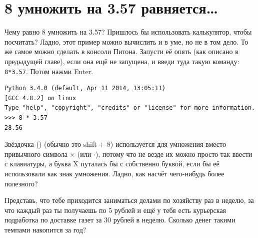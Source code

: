 

\chapter{8 умножить на 3.57 равняется…}\label{ch:8multipliedby3.57}

Чему равно 8 умножить на 3.57? Пришлось бы использовать калькулятор, чтобы посчитать? Ладно, этот пример можно вычислить и в уме, но не в том дело. То же самое можно сделать в консоли Питона. Запусти её опять (как описано в предыдущей главе), если она ещё не запущена, и введи туда такую команду: \texttt{8*3.57}. Потом нажми Enter.

\begin{verbatim}
Python 3.4.0 (default, Apr 11 2014, 13:05:11) 
[GCC 4.8.2] on linux
Type "help", "copyright", "credits" or "license" for more information.
>>> 8 * 3.57
28.56
\end{verbatim}

Звёздочка (\code{*}) (обычно это shift + 8) используется для умножения вместо привычного символа $×$ (или $\cdot$), потому что не везде их можно просто так ввести с клавиатуры, а буква X путалась бы с собственно буквой, если бы её использовали как знак умножения. Ладно, как насчёт чего-нибудь более полезного?

Представь, что тебе приходится заниматься делами по хозяйству раз в неделю, за что каждый раз ты получаешь по 5 рублей и ещё у тебя есть курьерская подработка по доставке газет за 30 рублей в неделю. Сколько денег такими темпами накопится за год?


